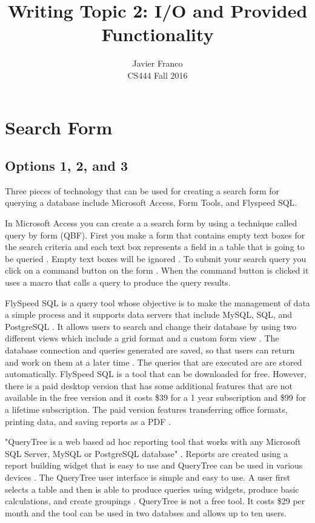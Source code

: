 \documentclass[12pt, draftclsnofoot, onecolumn]{IEEEtran}
\begin{document}
	\title{Writing Topic 2: I/O and Provided Functionality}
	\author{
		Javier Franco \\
		\endgraf
		CS444 Fall 2016
	}
	\maketitle
	
	\pagebreak

\section{Search Form}
\subsection{Options 1, 2, and 3}
Three pieces of technology that can be used for creating a search form for querying a database include Microsoft Access, Form Tools, and Flyspeed SQL. 

In Microsoft Access you can create a a search form by using a technique called query by form (QBF). First you make a form that contains empty text boxes for the search criteria and each text box represents a field in a table that is going to be queried \cite{Micro}. Empty text boxes will be ignored \cite{Micro}. To submit your search query you click on a command button on the form \cite{Micro}. When the command button is clicked it uses a macro that calls a query to produce the query results. 

FlySpeed SQL is a query tool whose objective is to make the management of data a simple process and it supports data servers that include MySQL, SQL, and PostgreSQL \cite{Andrew}. It allows users to search and change their database by using two different views which include a grid format and a custom form view \cite{Andrew}.  The database connection and queries generated are saved, so that users can return and work on them at a later time \cite{Fly}. The queries that are executed are are stored automatically\cite{Fly}. FlySpeed SQL is a tool that can be downloaded for free. However, there is a paid desktop version that has some additional features that are not available in the free version and it costs \$39 for a 1 year subscription and \$99 for a lifetime subscription. The paid version features transferring office formats, printing data, and saving reports as a PDF \cite{Fly}. 

"QueryTree is a web based ad hoc reporting tool that works with any Microsoft SQL Server, MySQL or PostgreSQL database" \cite{QueryTree}. Reports are created using a report building widget that is easy to use and QueryTree can be used in various devices \cite{QueryTree}. The QueryTree user interface is simple and easy to use. A user first selects a table and then is able to produce queries using widgets, produce basic calculations, and create groupings \cite{}. QueryTree is not a free tool. It costs \$29 per month and the tool can be used in two databses and allows up to ten users. 
\end{document}
